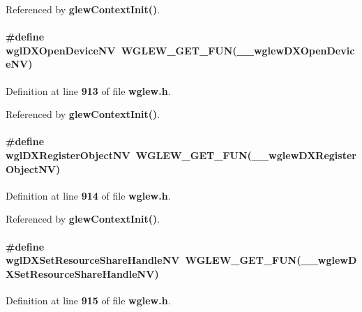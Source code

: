 Referenced by {\bf glew\+Context\+Init()}.

\paragraph[{wgl\+D\+X\+Open\+Device\+NV}]{\setlength{\rightskip}{0pt plus 5cm}\#define wgl\+D\+X\+Open\+Device\+NV~{\bf W\+G\+L\+E\+W\+\_\+\+G\+E\+T\+\_\+\+F\+UN}({\bf \+\_\+\+\_\+wglew\+D\+X\+Open\+Device\+NV})}\label{wglew_8h_a6dd0d96a01e6600977d461f49fd5ccaf}


Definition at line {\bf 913} of file {\bf wglew.\+h}.



Referenced by {\bf glew\+Context\+Init()}.

\paragraph[{wgl\+D\+X\+Register\+Object\+NV}]{\setlength{\rightskip}{0pt plus 5cm}\#define wgl\+D\+X\+Register\+Object\+NV~{\bf W\+G\+L\+E\+W\+\_\+\+G\+E\+T\+\_\+\+F\+UN}({\bf \+\_\+\+\_\+wglew\+D\+X\+Register\+Object\+NV})}\label{wglew_8h_a3bc170471fbe14d4369234e5dfcd0926}


Definition at line {\bf 914} of file {\bf wglew.\+h}.



Referenced by {\bf glew\+Context\+Init()}.

\paragraph[{wgl\+D\+X\+Set\+Resource\+Share\+Handle\+NV}]{\setlength{\rightskip}{0pt plus 5cm}\#define wgl\+D\+X\+Set\+Resource\+Share\+Handle\+NV~{\bf W\+G\+L\+E\+W\+\_\+\+G\+E\+T\+\_\+\+F\+UN}({\bf \+\_\+\+\_\+wglew\+D\+X\+Set\+Resource\+Share\+Handle\+NV})}\label{wglew_8h_a494c1a61e7bccb198a03b19b98420556}


Definition at line {\bf 915} of file {\bf wglew.\+h}.



